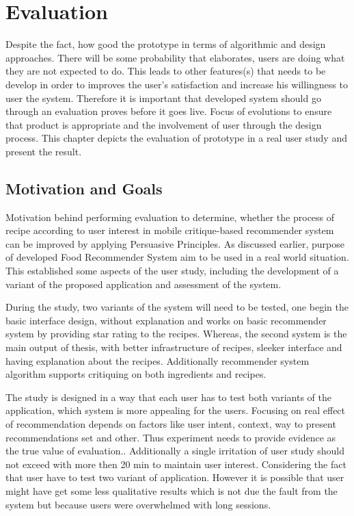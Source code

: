 \chapter{Evaluation}

Despite the fact, how good the prototype in terms of algorithmic and design approaches. There will be some probability that elaborates, users are doing what they are not expected to do.  This leads to other features(s) that needs to be develop in order to improves the user’s satisfaction and increase his willingness to user the system. Therefore it is important that developed system should go through an evaluation proves before it goes live. Focus of evolutions to ensure that product is appropriate and the involvement of user through the design process. This chapter depicts the evaluation of prototype in a real user study and present the result.

\section{Motivation and Goals}

Motivation behind performing evaluation to determine, whether the process of recipe according to user interest in mobile critique-based recommender system can be improved by applying Persuasive Principles. As discussed earlier, purpose of developed Food Recommender System aim to be used in a real world situation. This established some aspects of the user study, including the development of a variant of the proposed application and assessment of the system.\newline

During the study, two variants of the system will need to be tested, one begin the basic interface design, without explanation and works on basic recommender system by providing star rating to the recipes. Whereas, the second system is the main output of thesis, with better infrastructure of recipes, sleeker interface and having explanation about the recipes. Additionally recommender system algorithm supports critiquing on both ingredients and recipes.\newline 

The study is designed in a way that each user has to test both variants of the application, which system is more appealing for the users. Focusing on real effect of recommendation depends on factors like user intent, context, way to present recommendations set and other. Thus experiment needs to provide evidence as the true value of evaluation.\cite{shani2011evaluating}. Additionally a single irritation of user study should not exceed with more then 20 min to maintain user interest. Considering the fact that user have to test two variant of application. However it is possible that user might have get some less qualitative results which is not due the fault from the system but because users were overwhelmed with long sessions.  \newline

